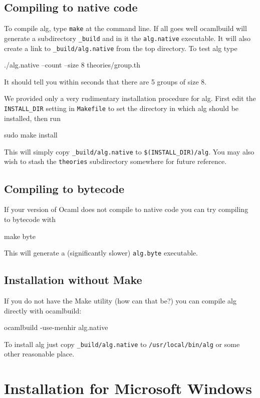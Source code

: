 \documentclass{report}
\begin{document}
\subsection{Compiling to native code}

To compile alg, type \texttt{make} at the command line. If all goes
well ocamlbuild will generate a subdirectory \texttt{\_build} and in
it the \texttt{alg.native} executable. It will also create a link to
\texttt{\_build/alg.native} from the top directory. To test alg type
%
\begin{shell}
./alg.native --count --size 8 theories/group.th
\end{shell}
%
It should tell you within seconds that there are 5 groups of size 8. 

We provided only a very rudimentary installation procedure for alg.
First edit the \texttt{INSTALL\_DIR} setting in \texttt{Makefile} to
set the directory in which alg should be installed, then run
%
\begin{shell}
sudo make install
\end{shell}
%
This will simply copy \texttt{\_build/alg.native} to
\texttt{\$(INSTALL\_DIR)/alg}. You may also wish to stash the
\texttt{theories} subdirectory somewhere for future reference.

\subsection{Compiling to bytecode}

If your version of Ocaml does not compile to native code you can try
compiling to bytecode with
%
\begin{shell}
make byte
\end{shell}
%
This will generate a (significantly slower) \texttt{alg.byte} executable.

\subsection{Installation without Make}

If you do not have the Make utility (how can that be?) you can compile
alg directly with ocamlbuild:
%
\begin{shell}
ocamlbuild -use-menhir alg.native
\end{shell}
%
To install alg just copy \texttt{\_build/alg.native} to
\texttt{/usr/local/bin/alg} or some other reasonable place.

\section{Installation for Microsoft Windows}
\label{sec:comp-inst-micr}
\end{document}
